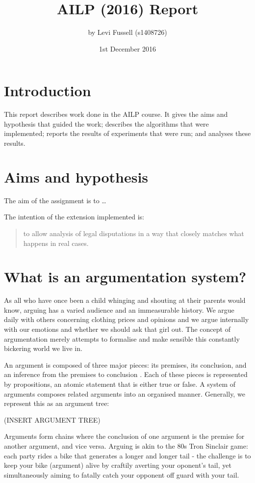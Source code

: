\documentclass[10pt,a4paper,twocolumn]{article}
\title{AILP (2016) Report}               %
\author{by Levi Fussell (s1408726)}
\date{1st December 2016}                 %
\begin{document}
\maketitle  %
%
\section{Introduction}

This report describes work done in the AILP
course.  It gives the aims and hypothesis that guided the work;
describes the algorithms that were implemented;  reports the results
of experiments that were run;  and analyses these results.

\section{Aims and hypothesis}

The aim of the assignment is to \dots

The intention of the extension implemented is:
\begin{quote}
   to allow analysis of legal disputations in a way that closely matches
   what happens in real cases.
\end{quote}

\section{What is an argumentation system?}

As all who have
once been a child whinging and shouting at their parents would know, arguing has
a varied audience and an immeasurable history. We argue daily
with others concerning clothing prices and opinions and we argue internally with our
emotions and whether we should ask that girl out. The concept of argumentation merely attempts to
formalise and make sensible this constantly bickering world we live in.

An argument is composed of three major pieces: its premises, its conclusion,
and an inference from the premises to conclusion \cite{ES2}. Each of
these pieces is represented by propositions, an atomic statement that is either
true or false. A system of arguments composes related arguments into an
organised manner. Generally, we represent this as an argument tree:

(INSERT ARGUMENT TREE)

Arguments form chains where the conclusion of one argument is the premise for
another argument, and vice versa. Arguing is akin to the 80s Tron Sinclair game:
each party rides a bike that generates a longer and longer tail - the
challenge is to keep your bike (argument) alive by craftily averting your
oponent's tail, yet
simultaneously aiming to fatally catch your opponent off guard with your tail.
\end{document}
